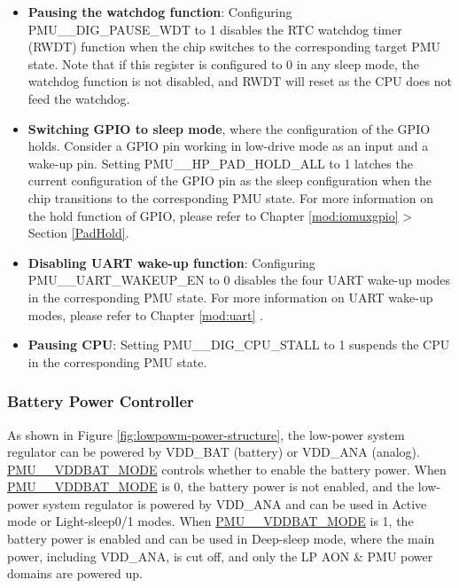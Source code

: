 \documentclass[main\_\_EN.tex]{subfiles}
\begin{document}
\begin{itemize}
\item \textbf{Pausing the watchdog function}: Configuring PMU\_\_DIG\_PAUSE\_WDT to 1 disables the RTC watchdog timer (RWDT) function when the chip switches to the corresponding target PMU state. Note that if this register is configured to 0 in any sleep mode, the watchdog function is not disabled, and RWDT will reset as the CPU does not feed the watchdog.

\item \textbf{Switching GPIO to sleep mode}, where the configuration of the GPIO holds. Consider a GPIO pin working in low-drive mode as an input and a wake-up pin. Setting PMU\_\_HP\_PAD\_HOLD\_ALL to 1 latches the current configuration of the GPIO pin as the sleep configuration when the chip transitions to the corresponding PMU state. For more information on the hold function of GPIO, please refer to Chapter \ref{mod:iomuxgpio} \textit{} > Section \ref{PadHold}.

\item \textbf{Disabling UART wake-up function}: Configuring PMU\_\_UART\_WAKEUP\_EN to 0 disables the four UART wake-up modes in the corresponding PMU state. For more information on UART wake-up modes, please refer to Chapter \ref{mod:uart} \textit{}.

\item \textbf{Pausing CPU}: Setting PMU\_\_DIG\_CPU\_STALL to 1 suspends the CPU in the corresponding PMU state.
\end{itemize}

\subsubsection{Battery Power Controller}

As shown in Figure \ref{fig:lowpowm-power-structure}, the low-power system regulator can be powered by VDD\_BAT (battery) or VDD\_ANA (analog). \hyperref[fielddesc:PMUHPSLEEPVDDBATMODE]{PMU\_\_VDDBAT\_MODE} controls whether to enable the battery power. When \hyperref[fielddesc:PMUHPSLEEPVDDBATMODE]{PMU\_\_VDDBAT\_MODE} is 0, the battery power is not enabled, and the low-power system regulator is powered by VDD\_ANA and can be used in Active mode or Light-sleep0/1 modes. When \hyperref[fielddesc:PMUHPSLEEPVDDBATMODE]{PMU\_\_VDDBAT\_MODE} is 1, the battery power is enabled and can be used in Deep-sleep mode, where the main power, including VDD\_ANA, is cut off, and only the LP AON \& PMU power domains are powered up.
\end{document}
